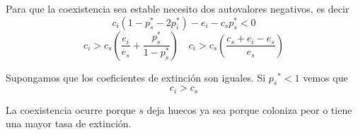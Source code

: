 \documentclass[twocolumn,aps,prl]{revtex4-1}
\begin{document}
Para que la coexistencia sea estable necesito dos autovalores negativos, es decir
$$
c_{i}\left(1-p_{s}^{*}-2 p_{i}^{*}\right)-e_{i}-c_{s} p_{s}^{*}<0
$$
$$
c_{i}>c_{s}\left(\frac{e_{i}}{e_{s}}+\frac{p_{s}^{*}}{1-p_{s}^{*}}\right) \quad c_{i}>c_{s}\left(\frac{c_{s}+e_{i}-e_{s}}{e_{s}}\right)
$$

Supongamos que los coeficientes de extinción son iguales. Si $p_{s}{ }^{*}<1$ vemos que
$$
c_{i}>c_{s}
$$

La coexistencia ocurre porque $s$ deja huecos ya sea porque coloniza peor o tiene una mayor tasa de extinción.

% 
\end{document}
